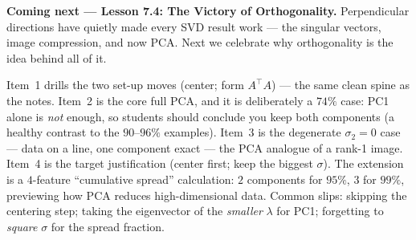\documentclass[10pt]{article}
\newcommand{\T}{^{\top}}
\begin{document}
\begin{spiralbox}
\textbf{Coming next --- Lesson 7.4: The Victory of Orthogonality.} Perpendicular directions have quietly made
every SVD result work --- the singular vectors, image compression, and now PCA. Next we celebrate why
orthogonality is the idea behind all of it.
\end{spiralbox}

\begin{teachernote}
Item~1 drills the two set-up moves (center; form $A\T A$) --- the same clean spine as the notes. Item~2 is the
core full PCA, and it is deliberately a $74\%$ case: PC1 alone is \emph{not} enough, so students should
conclude you keep both components (a healthy contrast to the $90$--$96\%$ examples). Item~3 is the degenerate
$\sigma_2=0$ case --- data on a line, one component exact --- the PCA analogue of a rank-1 image. Item~4 is the
target justification (center first; keep the biggest $\sigma$). The extension is a $4$-feature ``cumulative
spread'' calculation: $2$ components for $95\%$, $3$ for $99\%$, previewing how PCA reduces high-dimensional
data. Common slips: skipping the centering step; taking the eigenvector of the \emph{smaller} $\lambda$ for
PC1; forgetting to \emph{square} $\sigma$ for the spread fraction.
\end{teachernote}
\end{document}
